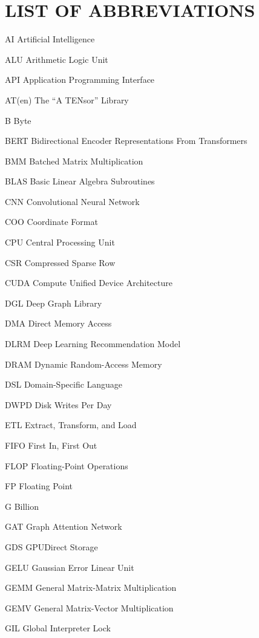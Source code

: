 \chapter{LIST OF ABBREVIATIONS}

\begin{symbollist*}
\item[AI] Artificial Intelligence
\item[ALU] Arithmetic Logic Unit
\item[API] Application Programming Interface
\item[AT(en)] The ``A TENsor'' Library
\item[B] Byte
\item[BERT] Bidirectional Encoder Representations From Transformers
\item[BMM] Batched Matrix Multiplication
\item[BLAS] Basic Linear Algebra Subroutines
\item[CNN] Convolutional Neural Network
\item[COO] Coordinate Format
\item[CPU] Central Processing Unit
\item[CSR] Compressed Sparse Row
\item[CUDA] Compute Unified Device Architecture
\item[DGL] Deep Graph Library
\item[DMA] Direct Memory Access
\item[DLRM] Deep Learning Recommendation Model
\item[DRAM] Dynamic Random-Access Memory
\item[DSL] Domain-Specific Language
\item[DWPD] Disk Writes Per Day
\item[ETL] Extract, Transform, and Load
\item[FIFO] First In, First Out
\item[FLOP] Floating-Point Operations
\item[FP] Floating Point
\item[G] Billion
\item[GAT] Graph Attention Network
\item[GDS] GPUDirect Storage
\item[GELU] Gaussian Error Linear Unit
\item[GEMM] General Matrix-Matrix Multiplication
\item[GEMV] General Matrix-Vector Multiplication
\item[GIL] Global Interpreter Lock

\end{symbollist*}
